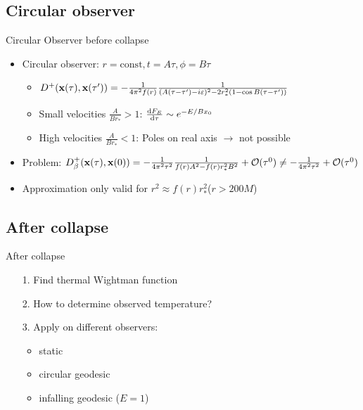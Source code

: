 \documentclass{beamer}
\begin{document}
\subsection{Circular observer}

\begin{frame}{Circular Observer before collapse}
\begin{itemize}
	\item Circular observer: \(r = \mathrm{const}, t = A\tau, \phi = B \tau\)
	\begin{itemize}
		\item \(D^+(\vb{x}(\tau), \vb{x}(\tau')) = -\frac{1}{4\pi^2f(r)} \frac{1}{(A(\tau-\tau')-i\varepsilon)^2 - 2r_*^2 (1 - \cos{B(\tau-\tau')})}\)
		\item Small velocities \(\frac{A}{Br_*} > 1\): \(\dv{F_E}{\tau} \sim e^{-E/B x_0}\)
		\item High velocities \(\frac{A}{Br_*} < 1\): Poles on real axis \(\to\) not possible
	\end{itemize}
	\item Problem: \(D^+_\beta(\vb{x}(\tau),\vb{x}(0)) = -\frac{1}{4\pi^2 \tau^2} \frac{1}{f(r) A^2 - f(r)r_*^2 B^2} + \order*{\tau^0}\neq -\frac{1}{4\pi^2 \tau^2} + \order*{\tau^0}\)
	\item Approximation only valid for \(r^2 \approx f(r)r_*^2\)\hspace{1cm}(\(r > 200 M\))
\end{itemize}
\end{frame}

\subsection{After collapse}
\begin{frame}{After collapse}
\begin{itemize}
	\item[1.] Find thermal Wightman function
	\item[]
	\item[2.] How to determine observed temperature?
	\item[]
	\item[3.] Apply on different observers:
	\begin{itemize}
		\item static
		\item circular geodesic
		\item infalling geodesic (\(E = 1\))
	\end{itemize}
\end{itemize}
\end{frame}
\end{document}
